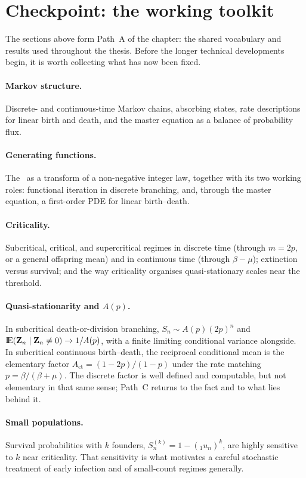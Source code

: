 \section{Checkpoint: the working toolkit}
\label{sec:checkpoint}

The sections above form Path~A of the chapter: the shared vocabulary and results used throughout the thesis. Before the longer technical developments begin, it is worth collecting what has now been fixed.

\paragraph{Markov structure.}
Discrete- and continuous-time Markov chains, absorbing states, rate descriptions for linear birth and death, and the master equation as a balance of probability flux.

\paragraph{Generating functions.}
The \pgf\ as a transform of a non-negative integer law, together with its two working roles: functional iteration in discrete branching, and, through the master equation, a first-order PDE for linear birth--death.

\paragraph{Criticality.}
Subcritical, critical, and supercritical regimes in discrete time (through $m=2p$, or a general offspring mean) and in continuous time (through $\beta-\mu$); extinction versus survival; and the way criticality organises quasi-stationary scales near the threshold.

\paragraph{Quasi-stationarity and $A(p)$.}
In subcritical death-or-division branching, $S_n\sim A(p)(2p)^n$ and ${\rm I}\!{\rm E}({\bf Z}_n\mid{\bf Z}_n\neq 0)\to 1/A(p)$, with a finite limiting conditional variance alongside. In subcritical continuous birth--death, the reciprocal conditional mean is the elementary factor $A_{\mathrm{ct}}=(1-2p)/(1-p)$ under the rate matching $p=\beta/(\beta+\mu)$. The discrete factor is well defined and computable, but not elementary in that same sense; Path~C returns to the fact and to what lies behind it.

\paragraph{Small populations.}
Survival probabilities with $k$ founders, $S_n^{(k)}=1-({}_1u_n)^k$, are highly sensitive to $k$ near criticality. That sensitivity is what motivates a careful stochastic treatment of early infection and of small-count regimes generally.

